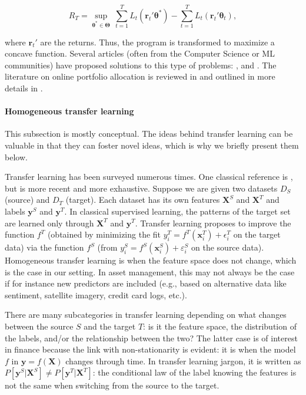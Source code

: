 \begin{equation}
R_T=\underset{\boldsymbol{\theta}^*\in \boldsymbol{\Theta}}{\sup} \ \sum_{t=1}^TL_t(\textbf{r}_t'\boldsymbol{\theta}^*)-\sum_{t=1}^TL_t(\textbf{r}_t'\boldsymbol{\theta}_t),
\end{equation}

where $\textbf{r}_t'$ are the returns. Thus, the program is transformed to maximize a concave function. Several articles (often from the Computer Science or ML communities) have proposed solutions to this type of problems: \cite{blum1999universal}, \cite{agarwal2006algorithms} and \cite{hazan2007logarithmic}. The literature on online portfolio allocation is reviewed in \cite{li2014online} and outlined in more details in \cite{li2018online}.

\paragraph{Homogeneous transfer learning}

This subsection is mostly conceptual. The ideas behind transfer learning can be valuable in that they can foster novel ideas, which is why we briefly present them below.

Transfer learning has been surveyed numerous times. One classical reference is \cite{pan2009survey}, but \cite{weiss2016survey} is more recent and more exhaustive. Suppose we are given two datasets $D_S$ (source) and $D_T$ (target). Each dataset has its own features $\textbf{X}^S$ and $\textbf{X}^T$ and labels $\textbf{y}^S$ and $\textbf{y}^T$. In classical supervised learning, the patterns of the target set are learned only through $\textbf{X}^T$ and $\textbf{y}^T$. Transfer learning proposes to improve the function $f^T$ (obtained by minimizing the fit $y_i^T=f^T(\textbf{x}_i^T)+\epsilon^T_i$ on the target data) via the function $f^S$ (from $y_i^S=f^S(\textbf{x}_i^S)+\varepsilon^S_i$ on the source data). Homogeneous transfer learning is when the feature space does not change, which is the case in our setting. In asset management, this may not always be the case if for instance new predictors are included (e.g., based on alternative data like sentiment, satellite imagery, credit card logs, etc.).

There are many subcategories in transfer learning depending on what changes between the source $S$ and the target $T$: is it the feature space, the distribution of the labels, and/or the relationship between the two? The latter case is of interest in finance because the link with non-stationarity is evident: it is when the model $f$ in $\textbf{y}=f(\textbf{X})$ changes through time. In transfer learning jargon, it is written as $P[\textbf{y}^S|\textbf{X}^S]\neq P[\textbf{y}^T|\textbf{X}^T]$: the conditional law of the label knowing the features is not the same when switching from the source to the target.

